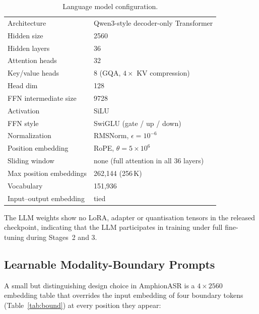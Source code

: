 \begin{table}[t]
  \caption{Language model configuration.}
  \label{tab:llm}
  \centering
  \small
  \begin{tabular}{ll}
    \toprule
    Architecture                & Qwen3-style decoder-only Transformer \\
    Hidden size                 & 2560 \\
    Hidden layers               & 36 \\
    Attention heads             & 32 \\
    Key/value heads             & 8 (GQA, $4\!\times$ KV compression) \\
    Head dim                    & 128 \\
    FFN intermediate size       & 9728 \\
    Activation                  & SiLU \\
    FFN style                   & SwiGLU (gate / up / down) \\
    Normalization               & RMSNorm, $\epsilon = 10^{-6}$ \\
    Position embedding          & RoPE, $\theta = 5 \times 10^{6}$ \\
    Sliding window              & none (full attention in all 36 layers) \\
    Max position embeddings     & 262{,}144 (256\,K) \\
    Vocabulary                  & 151{,}936 \\
    Input--output embedding     & tied \\
    \bottomrule
  \end{tabular}
\end{table}

The LLM weights show no LoRA, adapter or quantisation tensors in the
released checkpoint, indicating that the LLM participates in training
under full fine-tuning during Stages~2 and 3.

\subsection{Learnable Modality-Boundary Prompts}
\label{subsec:boundary-prompt}

A small but distinguishing design choice in AmphionASR is a
$4 \times 2560$ embedding table that overrides the input embedding of
four boundary tokens (Table~\ref{tab:bound}) at every position they
appear:

